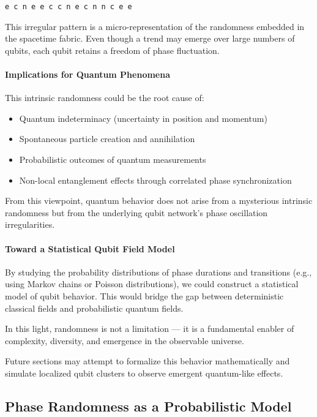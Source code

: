 \documentclass[12pt]{report} %
\begin{document}
\begin{center}
\texttt{e \quad c \quad n \quad e \quad e \quad c \quad c \quad n \quad e \quad c \quad n \quad n \quad c \quad e \quad e}
\end{center}

This irregular pattern is a micro-representation of the randomness embedded in the spacetime fabric. Even though a trend may emerge over large numbers of qubits, each qubit retains a freedom of phase fluctuation.

\paragraph{Implications for Quantum Phenomena}
This intrinsic randomness could be the root cause of:
\begin{itemize}
\item Quantum indeterminacy (uncertainty in position and momentum)
\item Spontaneous particle creation and annihilation
\item Probabilistic outcomes of quantum measurements
\item Non-local entanglement effects through correlated phase synchronization
\end{itemize}

From this viewpoint, quantum behavior does not arise from a mysterious intrinsic randomness but from the underlying qubit network’s phase oscillation irregularities.

\paragraph{Toward a Statistical Qubit Field Model}
By studying the probability distributions of phase durations and transitions (e.g., using Markov chains or Poisson distributions), we could construct a statistical model of qubit behavior. This would bridge the gap between deterministic classical fields and probabilistic quantum fields.

In this light, randomness is not a limitation — it is a fundamental enabler of complexity, diversity, and emergence in the observable universe.

Future sections may attempt to formalize this behavior mathematically and simulate localized qubit clusters to observe emergent quantum-like effects.



\subsection{Phase Randomness as a Probabilistic Model}
\end{document}
